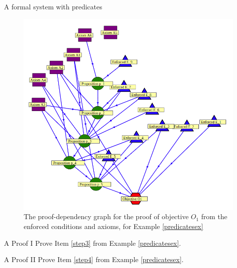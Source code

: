 \begin{example}{A formal system with predicates}
\begin{figure}
\includegraphics[width=12cm]{figures/certificate2}
		\caption{The proof-dependency graph for the proof of objective $O_1$ from the enforced conditions
		and axioms, for Example \ref{predicatesex}}\label{certificateinfgraph}
\end{figure}
\end{example}

\begin{exercise}{A Proof I}\label{step3ex}
Prove Item \ref{step3} from Example \ref{predicatesex}.
\end{exercise}

\begin{exercise}{A Proof II}\label{step4ex}
Prove Item \ref{step4} from Example \ref{predicatesex}.
\end{exercise}

